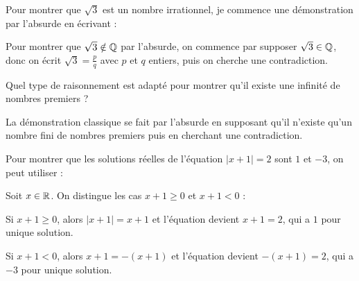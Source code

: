 \begin{question}
Pour montrer que $\sqrt{3}$ est un nombre irrationnel, je commence une démonstration par l'absurde en écrivant :
\begin{answers} 
\end{answers}
\begin{explanations} 
Pour montrer que $\sqrt{3} \notin \mathbb{Q}$ par l'absurde, on commence par supposer $\sqrt3\in\mathbb{Q}$, donc on écrit $\sqrt{3}=\frac pq$ avec $p$ et $q$ entiers, puis on cherche une contradiction.
\end{explanations}
\end{question}


\begin{question}
Quel type de raisonnement est adapté pour montrer qu'il existe une infinité de nombres premiers ?
\begin{answers} 
\end{answers}
\begin{explanations} 
La démonstration classique se fait par l'absurde en supposant qu'il n'existe qu'un nombre fini de nombres premiers puis en cherchant une contradiction.
\end{explanations}
\end{question}


\begin{question}
Pour montrer que les solutions réelles de l'équation $\vert x+1\vert =2$ sont $1$ et $-3$, on peut utiliser :
\begin{answers} 
\end{answers}
\begin{explanations} 
Soit $x\in\mathbb{R}$. On distingue les cas $x+1\ge 0$ et $x+1<0$ :

Si $x+1\ge 0$, alors $\vert x+1\vert =x+1$ et l'équation devient $x+1=2$, qui a $1$ pour unique solution.

Si $x+1<0$, alors $x+1=-(x+1)$ et l'équation devient $-(x+1)=2$, qui a $-3$ pour unique solution.
\end{explanations}
\end{question}


